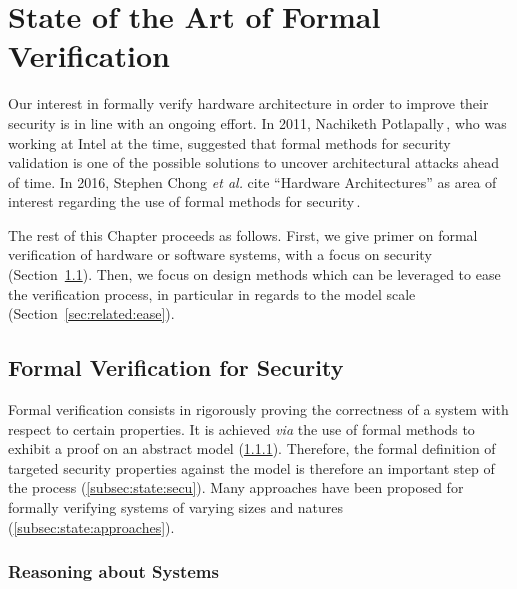 \chapter{State of the Art of Formal Verification}
\label{chapter:relatedwork}


\vspace{1cm}\noindent
%
Our interest in formally verify hardware architecture in order to improve their
security is in line with an ongoing effort.
%
In 2011, Nachiketh Potlapally\,\cite{potlapally2011hardwaresecurity}, who was
working at Intel at the time, suggested that formal methods for security
validation is one of the possible solutions to uncover architectural attacks
ahead of time.
%
In 2016, Stephen Chong \emph{et al.} cite ``Hardware Architectures'' as area of
interest regarding the use of formal methods for
security\,\cite{chong2016report}.

The rest of this Chapter proceeds as follows.
%
First, we give primer on formal verification of hardware or software systems,
with a focus on security (Section~\ref{sec:related:review}).
%
Then, we focus on design methods which can be leveraged to ease the verification
process, in particular in regards to the model scale
(Section~\ref{sec:related:ease}).

\section{Formal Verification for Security}
\label{sec:related:review}

Formal verification consists in rigorously proving the correctness of a system
with respect to certain properties.
%
It is achieved \emph{via} the use of formal methods to exhibit a proof on an
abstract model (\ref{subsec:state:reason}).
%
Therefore, the formal definition of targeted security properties against the
model is therefore an important step of the process (\ref{subsec:state:secu}).
%
Many approaches have been proposed for formally verifying systems of varying
sizes and natures (\ref{subsec:state:approaches}).

\subsection{Reasoning about Systems}
\label{subsec:state:reason}


